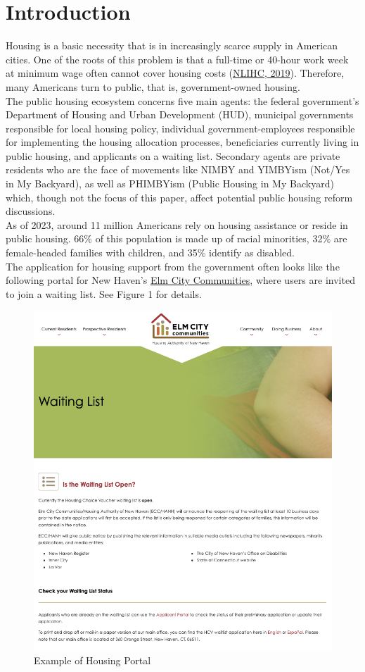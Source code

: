 \documentclass[11pt]{article}
\begin{document}
\section{Introduction}
Housing is a basic necessity that is in increasingly scarce supply in American cities. One of the roots of this problem is that a full-time or 40-hour work week at minimum wage often cannot cover housing costs (\href{https://reports.nlihc.org/oor/connecticut}{NLIHC, 2019}). Therefore, many Americans turn to public, that is, government-owned housing. \\
\newline
The public housing ecosystem concerns five main agents: the federal government’s Department of Housing and Urban Development (HUD), municipal governments responsible for local housing policy, individual government-employees  responsible for implementing the housing allocation processes, beneficiaries currently living in public housing, and applicants on a waiting list. Secondary agents are private residents who are the face of movements like NIMBY and YIMBYism (Not/Yes in My Backyard), as well as PHIMBYism (Public Housing in My Backyard) which, though not the focus of this paper, affect potential public housing reform discussions. \\
\newline
As of 2023, around 11 million Americans rely on housing assistance or reside in public housing. 66\% of this population is made up of racial minorities, 32\% are female-headed families with children, and 35\% identify as disabled. \\
\newline
The application for housing support from the government often looks like the following portal for New Haven’s \href{https://elmcitycommunities.org/waiting-list/}{Elm City Communities}, where users are invited to join a waiting list. See Figure 1 for details.
\newline
\begin{figure}
    \centering
    \includegraphics[width=0.75\linewidth]{elm.png}
    \caption{Example of Housing Portal}
\end{figure}
\end{document}

